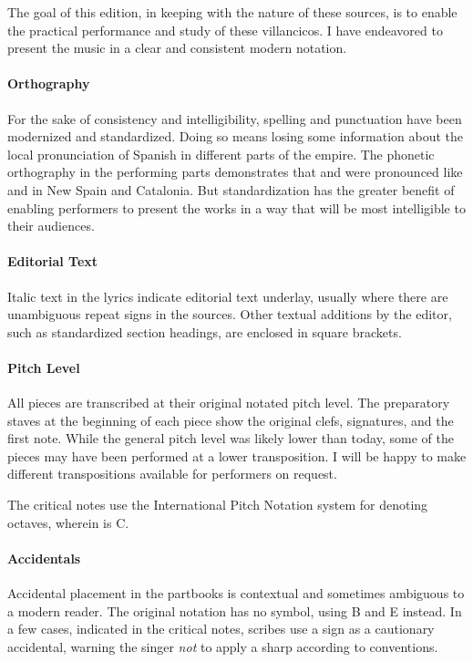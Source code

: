 The goal of this edition, in keeping with the nature of these sources, is to enable the practical performance and study of these villancicos.
I have endeavored to present the music in a clear and consistent modern notation.


\paragraph{Orthography}
For the sake of consistency and intelligibility, spelling and punctuation have been modernized and standardized.
Doing so means losing some information about the local pronunciation of Spanish in different parts of the empire.
The phonetic orthography in the performing parts demonstrates that  and  were pronounced like  and  in New Spain and Catalonia.
But standardization has the greater benefit of enabling performers to present the works in a way that will be most intelligible to their audiences.

\paragraph{Editorial Text}
Italic text in the lyrics indicate editorial text underlay, usually where there are unambiguous repeat signs in the sources.
Other textual additions by the editor, such as standardized section headings, are enclosed in square brackets.

\paragraph{Pitch Level}
All pieces are transcribed at their original notated pitch level.
The preparatory staves at the beginning of each piece show the original clefs, signatures, and the first note.
While the  general pitch level was likely lower than today, some of the pieces may have been performed at a lower transposition.
I will be happy to make different transpositions available for performers on request.

The critical notes use the International Pitch Notation system for denoting octaves, wherein  is C.



\paragraph{Accidentals}
Accidental placement in the partbooks is contextual and sometimes ambiguous to a modern reader.
The original notation has no \na{} symbol, using B\sh{} and E\sh{} instead.
In a few cases, indicated in the critical notes, scribes use a \sh{} sign as a cautionary accidental, warning the singer \emph{not} to apply a sharp according to  conventions.%
  \autocites{Harran:Cautionary1}{Harran:Cautionary2}


